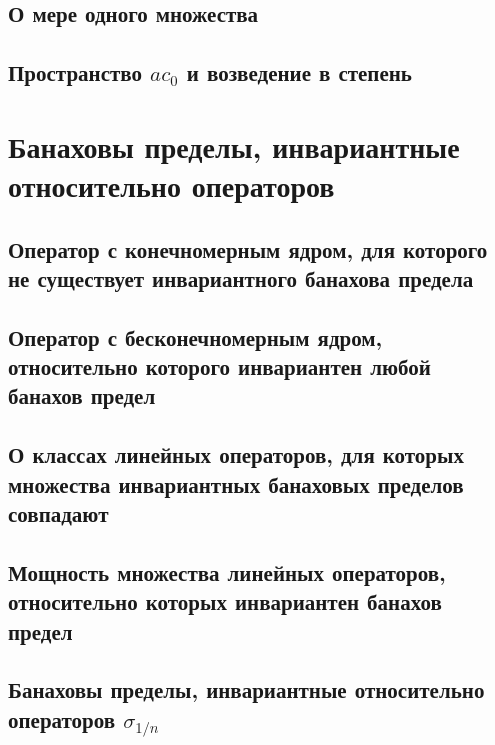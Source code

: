 \documentclass[12pt,a4paper,openbib]{report}
\theoremstyle{definition}
\begin{document}
	\section{О мере одного множества}
	

	\section{Пространство $ac_0$ и возведение в степень}
	

\chapter{Банаховы пределы, инвариантные относительно операторов}

	

	\section{Оператор с конечномерным ядром, для которого не существует инвариантного банахова предела}
	

	\section{Оператор с бесконечномерным ядром, относительно которого инвариантен любой банахов предел}
	

	\section{О классах линейных операторов, для которых множества инвариантных банаховых пределов совпадают}
	

	\section{Мощность множества линейных операторов, относительно которых инвариантен банахов предел}
	

	\section{Банаховы пределы, инвариантные относительно операторов $\sigma_{1/n}$}
	
\end{document}

